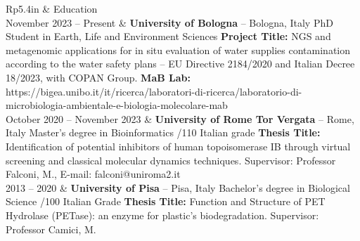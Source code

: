 \documentclass[letterpaper, 11pt]{article}
\newcommand{\headingfont}{\Large\color{OliveGreen}}
\newenvironment{SectionTable}[1]{
	\renewcommand*{\arraystretch}{1.7}
	\setlength{\tabcolsep}{10pt}
	\begin{longtable}{Rp{5.4in}} & #1 \\}
{\end{longtable}\vspace{-.3cm}}
\begin{document}
\begin{SectionTable}{\headingfont Education}
November 2023 -- Present &
\textbf{University of Bologna} -- Bologna, Italy \newline
PhD Student in Earth, Life and Environment Sciences \newline
\textbf{Project Title:} NGS and metagenomic applications for in situ evaluation of water supplies contamination according to the water safety plans -- EU Directive 2184/2020 and Italian Decree 18/2023, with COPAN Group. \newline
\textbf{MaB Lab:}\newline
https://bigea.unibo.it/it/ricerca/laboratori-di-ricerca/laboratorio-di-microbiologia-ambientale-e-biologia-molecolare-mab \\

October 2020 -- November 2023 & 
\textbf{University of Rome Tor Vergata} -- Rome, Italy \newline
Master's degree in Bioinformatics /110 Italian grade \newline
\textbf{Thesis Title:} Identification of potential inhibitors of human topoisomerase IB through virtual screening and classical molecular dynamics techniques.\newline
Supervisor: Professor Falconi, M., E-mail: falconi@uniroma2.it \\

2013 -- 2020 &
\textbf{University of Pisa} -- Pisa, Italy \newline
Bachelor's degree in Biological Science /100 Italian Grade \newline
\textbf{Thesis Title:} Function and Structure of PET Hydrolase (PETase): an enzyme for plastic's biodegradation. \newline
Supervisor: Professor Camici, M.
\end{SectionTable}
\end{document}
